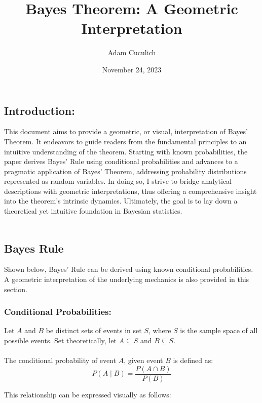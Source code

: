 \documentclass[12pt]{article}
\title{Bayes Theorem: A Geometric Interpretation}
\author{Adam Cuculich}
\date{November 24, 2023}
\begin{document}
\maketitle %

\subsection*{Introduction:}
This document aims to provide a geometric, or visual, interpretation of Bayes’ Theorem. It endeavors to guide readers from the fundamental principles to an intuitive understanding of the theorem. Starting with known probabilities, the paper derives Bayes’ Rule using conditional probabilities and advances to a pragmatic application of Bayes’ Theorem, addressing probability distributions represented as random variables. In doing so, I strive to bridge analytical descriptions with geometric interpretations, thus offering a comprehensive insight into the theorem’s intrinsic dynamics. Ultimately, the goal is to lay down a theoretical yet intuitive foundation in Bayesian statistics. \\\\

\newpage

\subsection*{Bayes Rule}
Shown below, Bayes' Rule can be derived using known conditional probabilities. A geometric interpretation of the underlying mechanics is also provided in this section.
\subsubsection*{Conditional Probabilities:}
Let \(A\) and \(B\) be distinct sets of events in set \(S\), where \(S\) is the sample space of all possible events. Set theoretically, let  \( A \subseteq S \) and \( B \subseteq S \). \\\\
The conditional probability of event \( A \), given event \( B \) is defined as:
\begin{equation}
P(A \mid B) = \frac{P(A \cap B)}{P(B)}
\end{equation}

\noindent This relationship can be expressed visually as follows:\\
\end{document}
